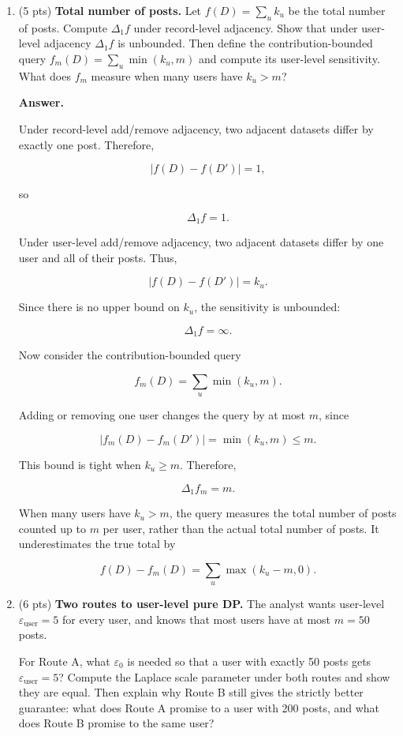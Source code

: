 \documentclass[11pt]{article}
\newcommand{\Lap}{\mathrm{Lap}}
\newcommand{\eps}{\varepsilon}
\newcommand{\user}{\mathrm{user}}
\newenvironment{answer}{\par\medskip\noindent\textbf{Answer.}\ }{\par\bigskip}
\begin{document}
\begin{enumerate}

\item (5 pts) \textbf{Total number of posts.} Let $f(D)=\sum_u k_u$ be the
total number of posts. Compute $\Delta_1 f$ under record-level adjacency. Show
that under user-level adjacency $\Delta_1 f$ is unbounded. Then define the
contribution-bounded query $f_m(D)=\sum_u\min(k_u,m)$ and compute its
user-level sensitivity. What does $f_m$ measure when many users have
$k_u>m$?

\begin{answer}

Under record-level add/remove adjacency,
two adjacent datasets differ by exactly
one post. Therefore,

\[
|f(D)-f(D')|=1,
\]

so

\[
\boxed{\Delta_1 f=1}.
\]

Under user-level add/remove adjacency,
two adjacent datasets differ by one user
and all of their posts. Thus,

\[
|f(D)-f(D')|=k_u.
\]

Since there is no upper bound on $k_u$,
the sensitivity is unbounded:

\[
\boxed{\Delta_1 f=\infty}.
\]

Now consider the contribution-bounded query

\[
f_m(D)=\sum_u\min(k_u,m).
\]

Adding or removing one user changes
the query by at most $m$, since

\[
|f_m(D)-f_m(D')|
=\min(k_u,m)\le m.
\]

This bound is tight when $k_u\ge m$.
Therefore,

\[
\boxed{\Delta_1 f_m=m}.
\]

When many users have $k_u>m$, the query
measures the total number of posts counted
up to $m$ per user, rather than the actual
total number of posts. It underestimates
the true total by

\[
f(D)-f_m(D)
=\sum_u\max(k_u-m,0).
\]

\end{answer}

\item (6 pts) \textbf{Two routes to user-level pure DP.} The analyst wants
user-level $\eps_{\user}=5$ for every user, and knows that most users have at
most $m=50$ posts.
For Route A, what $\eps_0$ is needed so that a user with exactly 50 posts gets
$\eps_{\user}=5$? Compute the Laplace scale parameter under both routes and
show they are equal. Then explain why Route B still gives the strictly better
guarantee: what does Route A promise to a user with 200 posts, and what does
Route B promise to the same user?


\end{enumerate}
\end{document}
